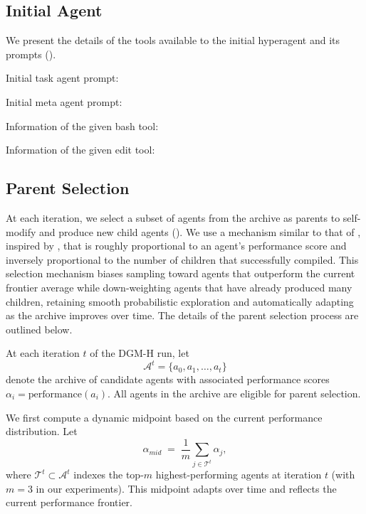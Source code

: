 \documentclass{article}
\begin{document}
\subsection{Initial Agent}
\label{app:initial-agent}

We present the details of the tools available to the initial hyperagent and its prompts ().

Initial task agent prompt:


Initial meta agent prompt:


Information of the given bash tool:


Information of the given edit tool:


\subsection{Parent Selection}
\label{app:parent-selection}

At each iteration, we select a subset of agents from the archive as parents to self-modify and produce new child agents (). We use a mechanism similar to that of \citet{zhang2025darwin}, inspired by \citet{ecoffet2019go}, that is roughly proportional to an agent's performance score and inversely proportional to the number of children that successfully compiled. This selection mechanism biases sampling toward agents that outperform the current frontier average while down-weighting agents that have already produced many children, retaining smooth probabilistic exploration and automatically adapting as the archive improves over time. The details of the parent selection process are outlined below.

At each iteration \(t\) of the DGM-H run, let
\[
\mathcal{A}^t = \{a_0, a_1, \dots, a_t\}
\]
denote the archive of candidate agents with associated performance scores
\(\alpha_i = \mathrm{performance}(a_i)\).
All agents in the archive are eligible for parent selection.

We first compute a dynamic midpoint based on the current performance distribution. Let
\[
\alpha_{mid} \;=\; \frac{1}{m}\sum_{j \in \mathcal{T}^t} \alpha_j,
\]
where \(\mathcal{T}^t \subset \mathcal{A}^t\) indexes the top-\(m\) highest-performing agents at iteration \(t\) (with \(m=3\) in our experiments).
This midpoint adapts over time and reflects the current performance frontier.
\end{document}
